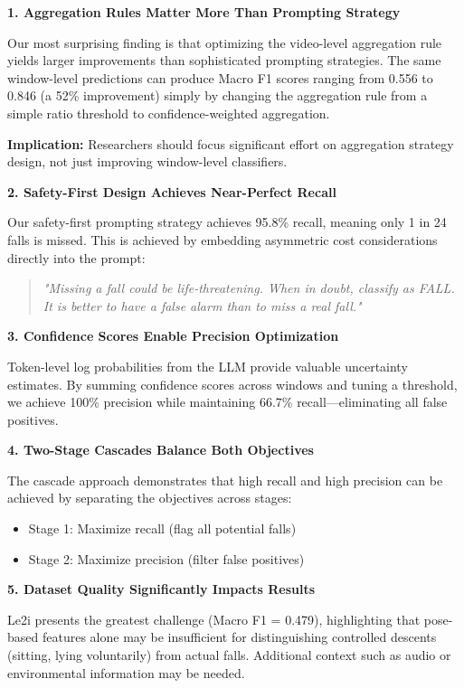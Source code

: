 \documentclass[conference]{IEEEtran}
\begin{document}
\textbf{1. Aggregation Rules Matter More Than Prompting Strategy}

Our most surprising finding is that optimizing the video-level aggregation rule yields larger improvements than sophisticated prompting strategies. The same window-level predictions can produce Macro F1 scores ranging from 0.556 to 0.846 (a 52\% improvement) simply by changing the aggregation rule from a simple ratio threshold to confidence-weighted aggregation.

\textbf{Implication:} Researchers should focus significant effort on aggregation strategy design, not just improving window-level classifiers.

\textbf{2. Safety-First Design Achieves Near-Perfect Recall}

Our safety-first prompting strategy achieves 95.8\% recall, meaning only 1 in 24 falls is missed. This is achieved by embedding asymmetric cost considerations directly into the prompt:
\begin{quote}
\textit{"Missing a fall could be life-threatening. When in doubt, classify as FALL. It is better to have a false alarm than to miss a real fall."}
\end{quote}

\textbf{3. Confidence Scores Enable Precision Optimization}

Token-level log probabilities from the LLM provide valuable uncertainty estimates. By summing confidence scores across windows and tuning a threshold, we achieve 100\% precision while maintaining 66.7\% recall—eliminating all false positives.

\textbf{4. Two-Stage Cascades Balance Both Objectives}

The cascade approach demonstrates that high recall and high precision can be achieved by separating the objectives across stages:
\begin{itemize}[leftmargin=*]
    \item Stage 1: Maximize recall (flag all potential falls)
    \item Stage 2: Maximize precision (filter false positives)
\end{itemize}

\textbf{5. Dataset Quality Significantly Impacts Results}

Le2i presents the greatest challenge (Macro F1 = 0.479), highlighting that pose-based features alone may be insufficient for distinguishing controlled descents (sitting, lying voluntarily) from actual falls. Additional context such as audio or environmental information may be needed.
\end{document}
